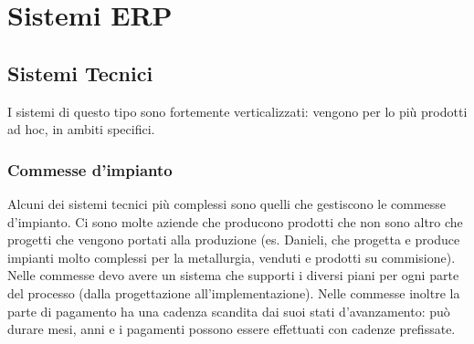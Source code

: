 \chapter{Sistemi ERP}
\label{chap:Sistemi ERP}
\section{Sistemi Tecnici}
\label{sec:Sistemi Tecnici}

I sistemi di questo tipo sono fortemente verticalizzati: vengono
per lo pi\`u prodotti ad hoc, in ambiti specifici.
\subsection{Commesse d'impianto}
\label{sub:Commesse d'impianto}
Alcuni dei sistemi tecnici pi\`u complessi sono quelli che gestiscono
le commesse d'impianto. Ci sono molte aziende che producono prodotti che
non sono altro che progetti che vengono portati alla produzione (es. Danieli,
che progetta e produce impianti molto complessi per la metallurgia, venduti e
prodotti su commisione).\\
Nelle commesse devo avere un sistema che supporti i diversi piani
per ogni parte del processo (dalla progettazione all'implementazione).
Nelle commesse inoltre la parte di pagamento ha una cadenza scandita dai suoi stati
d'avanzamento: pu\`o durare mesi, anni e i pagamenti possono essere
effettuati con cadenze prefissate.\\

